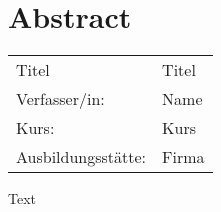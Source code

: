 \section*{Abstract}

	\begingroup
	\begin{table}[h!]
		\setlength\tabcolsep{0pt}
		\begin{tabular}{p{3.7cm}p{11.7cm}}
			Titel & Titel\\
			Verfasser/in: & Name\\
			Kurs: & Kurs \\
			Ausbildungsstätte: & Firma\\
		\end{tabular}
	\end{table}
	\endgroup

	Text